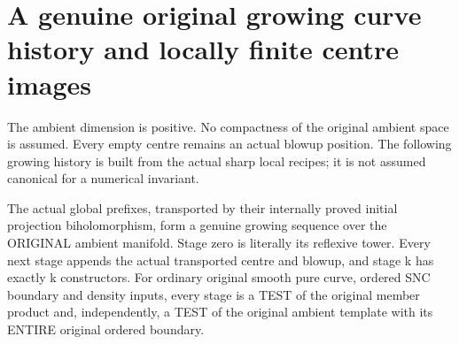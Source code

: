 \section{A genuine original growing curve history and locally finite centre images}

The ambient dimension is positive. No compactness of the original ambient
space is assumed. Every empty centre remains an actual blowup position.
The following growing history is built from the actual sharp local recipes;
it is not assumed canonical for a numerical invariant.

\begin{theorem}
\label{hir:sharp-actual-curve-original-growing-history}
\leanok
The actual global prefixes, transported by their internally proved initial
projection biholomorphism, form a genuine growing sequence over the ORIGINAL
ambient manifold. Stage zero is literally its reflexive tower. Every next
stage appends the actual transported centre and blowup, and stage k has
exactly k constructors. For ordinary original smooth pure curve, ordered
SNC boundary and density inputs, every stage is a TEST of the original
member product and, independently, a TEST of the original ambient template
with its ENTIRE original ordered boundary.
\end{theorem}
